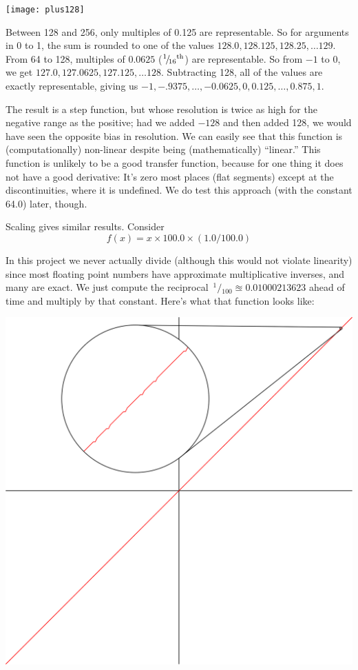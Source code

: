 \documentclass[twocolumn]{article}
\newcommand\sfrac[2]{\!{}\,^{#1}\!/{}\!_{#2}}
\begin{document}
\begin{center}
\texttt{[image: plus128]}
\end{center}


Between 128 and 256, only multiples of 0.125 are representable. So for
arguments in 0 to 1, the sum is rounded to one of the values $128.0,
128.125, 128.25, \ldots 129$. From 64 to 128, multiples of $0.0625$
($\sfrac{1}{16}\th$) are representable. So from $-1$ to $0$, we get $127.0, 127.0625,
127.125, \ldots 128$. Subtracting 128, all of the values are exactly
representable, giving us $-1, -.9375, \ldots, -0.0625, 0, 0.125,
\ldots, 0.875, 1$.

The result is a step function, but whose resolution is twice as high
for the negative range as the positive; had we added $-128$ and then
added 128, we would have seen the opposite bias in resolution. We can
easily see that this function is (computationally) non-linear despite
being (mathematically) ``linear.'' This function is unlikely to be a
good transfer function, because for one thing it does not have a good
derivative: It's zero most places (flat segments) except at the
discontinuities, where it is undefined. We do test this approach (with
the constant 64.0) later, though.

Scaling gives similar results. Consider
%
$$f(x) = x \times 100.0 \times (1.0 / 100.0)$$

In this project we never actually divide (although this would not
violate linearity) since most floating point numbers have approximate
multiplicative inverses, and many are exact. We just compute the
reciprocal $\sfrac{1}{100} \approxeq 0.01000213623$ ahead of time and
multiply by that constant. Here's what that function looks like:

\begin{center}
\includegraphics[width=0.45 \linewidth]{times100zoom}
\end{center}
\end{document}
